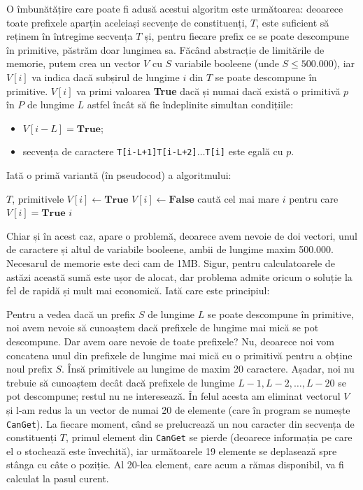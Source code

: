O îmbunătățire care poate fi adusă acestui algoritm este următoarea: deoarece
toate prefixele aparțin aceleiași secvențe de constituenți, $T$, este
suficient să reținem în întregime secvența $T$ și, pentru fiecare prefix ce se
poate descompune în primitive, păstrăm doar lungimea sa. Făcând abstracție de
limitările de memorie, putem crea un vector $V$ cu $S$ variabile booleene
(unde $S \leq 500.000$), iar $V[i]$ va indica dacă subșirul de lungime $i$ din
$T$ se poate descompune în primitive. $V[i]$ va primi valoarea {\bf True} dacă
și numai dacă există o primitivă $p$ în $P$ de lungime $L$ astfel încât să fie
îndeplinite simultan condițiile:

\begin{itemize}

\item $V[i-L] = \mathbf{True}$;

\item secvența de caractere {\tt T[i-L+1]T[i-L+2]$\dots$T[i]} este egală cu
  $p$.

\end{itemize}

Iată o primă variantă (în pseudocod) a algoritmului:

\vspace{\algskip}
\begin{algorithmic}[1]
  \REQUIRE $T$, primitivele
  \STATE $V[i] \leftarrow \mathbf{True}$
  \ELSE
  \STATE $V[i] \leftarrow \mathbf{False}$
  \ENDIF
  \ENDFOR
  \STATE caută cel mai mare $i$ pentru care $V[i] = \mathbf{True}$
  \PRINT $i$
\end{algorithmic}

Chiar și în acest caz, apare o problemă, deoarece avem nevoie de doi vectori,
unul de caractere și altul de variabile booleene, ambii de lungime maxim
500.000. Necesarul de memorie este deci cam de 1MB. Sigur, pentru
calculatoarele de astăzi această sumă este ușor de alocat, dar problema admite
oricum o soluție la fel de rapidă și mult mai economică. Iată care este
principiul:

Pentru a vedea dacă un prefix $S$ de lungime $L$ se poate descompune în
primitive, noi avem nevoie să cunoaștem dacă prefixele de lungime mai mică se
pot descompune. Dar avem oare nevoie de toate prefixele? Nu, deoarece noi vom
concatena unul din prefixele de lungime mai mică cu o primitivă pentru a
obține noul prefix $S$. Însă primitivele au lungime de maxim 20
caractere. Așadar, noi nu trebuie să cunoaștem decât dacă prefixele de lungime
$L-1, L-2, \dots, L-20$ se pot descompune; restul nu ne interesează. În felul
acesta am eliminat vectorul $V$ și l-am redus la un vector de numai 20 de
elemente (care în program se numește {\tt CanGet}). La fiecare moment, când se
prelucrează un nou caracter din secvența de constituenți $T$, primul element
din {\tt CanGet} se pierde (deoarece informația pe care el o stochează este
învechită), iar următoarele 19 elemente se deplasează spre stânga cu câte o
poziție. Al 20-lea element, care acum a rămas disponibil, va fi calculat la
pasul curent.

